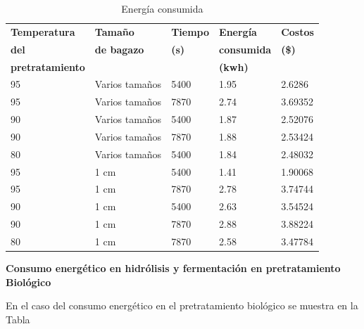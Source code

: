 \documentclass[12pt]{article}
\begin{document}
			
			\begin{table}[H]
				\centering
				\label{energi_}
				\caption{Energía consumida }
					\resizebox{12cm}{!} {
				\begin{tabular}{|l|l|l|l|l|}
					\hline
		\textbf{Temperatura} & \textbf{Tamaño } & \textbf{Tiempo} & \textbf{Energía } & \textbf{Costos } \\ 
				\textbf{del} &	\textbf{ de bagazo}  &	\textbf{ (s)} & 	\textbf{consumida  }& 	\textbf{(\$)} \\ 
	\textbf{pretratamiento}  &  &  & \textbf{(kwh)} &  \\ \hline
					95 & Varios  tamaños & 5400 & 1.95 & 2.6286  \\ \hline
					95 & Varios  tamaños & 7870 & 2.74 & 3.69352  \\ \hline
					90 & Varios  tamaños & 5400 & 1.87 & 2.52076  \\ \hline
					90 & Varios  tamaños & 7870 & 1.88 & 2.53424  \\ \hline
					80 & Varios  tamaños & 5400 & 1.84 & 2.48032  \\ \hline
					95 & 1 cm & 5400 & 1.41 & 1.90068  \\ \hline
					95 & 1 cm  & 7870 & 2.78 & 3.74744  \\ \hline
					90 & 1 cm  & 5400 & 2.63 & 3.54524  \\ \hline
					90 & 1 cm  & 7870 & 2.88 & 3.88224  \\ \hline
					80 & 1 cm & 7870 & 2.58 & 3.47784  \\ \hline
				\end{tabular}}

			\end{table}


		


	\textbf{ Consumo energético en hidrólisis y fermentación en pretratamiento Biológico }
	
	En el caso del consumo energético en el pretratamiento biológico se muestra en la Tabla 
	
\end{document}
